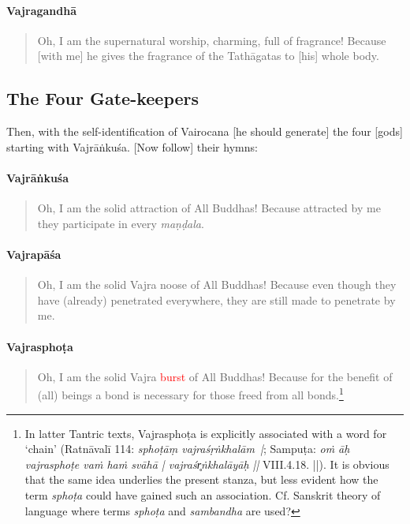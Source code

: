 \documentclass[11pt]{book}
\newcommand{\red}[1]{\textcolor{red}{#1}}
\newcommand{\skt}[1]{\emph{#1}}
\begin{document}
\paragraph{Vajragandhā}

\begin{verse}
Oh, I am the supernatural worship, charming, full of fragrance! Because [with me] he gives the fragrance of the Tathāgatas to [his] whole body.
\end{verse}

\subsection{The Four Gate-keepers}

Then, with the self-identification of Vairocana [he should generate] the four [gods] starting with Vajrāṅkuśa. [Now follow] their hymns:

\paragraph{Vajrāṅkuśa}

\begin{verse}
Oh, I am the solid attraction of All Buddhas! Because attracted by me they participate in every \skt{maṇḍala}.\\
\end{verse}

\paragraph{Vajrapāśa}

\begin{verse}
Oh, I am the solid Vajra noose of All Buddhas! Because even though they have (already) penetrated everywhere, they are still made to penetrate by me.\\
\end{verse}

\paragraph{Vajrasphoṭa}

\begin{verse}
Oh, I am the solid Vajra \red{burst} of All Buddhas! Because for the benefit of (all) beings a bond is necessary for those freed from all bonds.\footnote{In latter Tantric texts, Vajrasphoṭa is explicitly associated with a word for `chain' (Ratnāvalī 114: \skt{sphoṭāṃ vajraśṛṅkhalām~|}; Sampuṭa: \skt{oṁ āḥ vajrasphoṭe vaṁ haṁ svāhā | vajraśr̥ṅkhalāyāḥ ||} VIII.4.18. ||). It is obvious that the same idea underlies the present stanza, but less evident how the term \skt{sphoṭa} could have gained such an association. Cf. Sanskrit theory of language where terms \skt{sphoṭa} and \skt{sambandha} are used?}
\end{verse}
\end{document}
